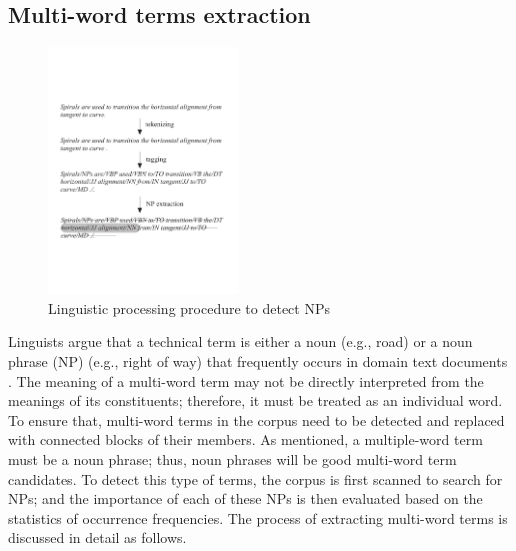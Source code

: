 \documentclass[Journal, BackFigs,NoLists, DoubleSpace]{ascelike}%
\begin{document}
\subsection{Multi-word terms extraction}
%
\begin{figure}[t]
	\centering
	\includegraphics[width=0.45\textwidth]{Figure2_NP_extraction}
	\caption{Linguistic processing procedure to detect NPs}
	\label{fig:np_detect}
\end{figure}
%
Linguists argue that a technical term is either a noun (e.g., road) or a noun phrase (NP) (e.g., right of way) that frequently occurs in domain text documents \cite{justeson95}. The meaning of a multi-word term may not be directly interpreted from the meanings of its constituents; therefore, it must be treated as an individual word.  To ensure that, multi-word terms in the corpus need to be detected and replaced with connected blocks of their members. As mentioned, a multiple-word term must be a noun phrase; thus, noun phrases will be good multi-word term candidates. To detect this type of terms, the corpus is first scanned to search for NPs; and the importance of each of these NPs is then evaluated based on the statistics of occurrence frequencies. The process of extracting multi-word terms is discussed in detail as follows.  %
\end{document}
